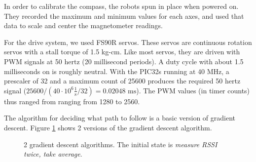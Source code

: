 \documentclass[]{article}
\let\oldparagraph\paragraph
\renewcommand{\paragraph}[1]{\oldparagraph{#1}\mbox{}}
\begin{document}
In order to calibrate the compass, the robots spun in place when powered
on.
They recorded the maximum and minimum values for each axes, and used
that data to scale and center the magnetometer readings.


For the drive system, we used FS90R servos.
These servos are continuous rotation servos with a stall torque of 1.5 kg-cm.
Like most servos, they are driven with PWM signals at 50 hertz (20 millisecond periods).
A duty cycle with about 1.5 milliseconds on is roughly neutral.
With the PIC32s running at 40 MHz, a prescaler of 32 and a maximum count of 25600 produces the required 50 hertz signal ($25600/\left(40\cdot 10^6 \frac{1}{\text{s}}/ 32 \right) = 0.02048 \text{ ms}$).
The PWM values (in timer counts) thus ranged from ranging from 1280 to 2560.


The algorithm for deciding what path to follow is a basic version of
gradient descent. Figure \ref{fig:graddesc} shows 2 versions of the gradient descent algorithm.

\begin{figure}
  \centering
  \caption{2 gradient descent algorithms. The initial state is \emph{measure RSSI twice, take average}.}
  \label{fig:graddesc}
\end{figure}
\end{document}
